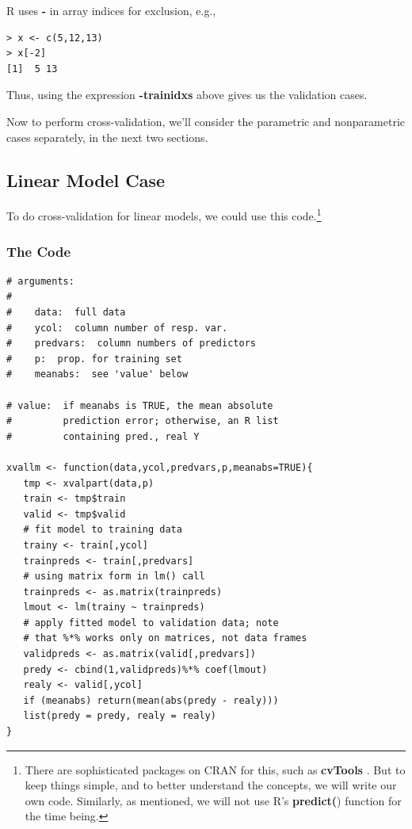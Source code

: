 R uses {\bf -} in array indices for exclusion, e.g.,

\begin{lstlisting}
> x <- c(5,12,13)
> x[-2]
[1]  5 13
\end{lstlisting}

Thus, using the expression {\bf -trainidxs} above gives us the validation
cases.

Now to perform cross-validation, we'll consider the parametric and
nonparametric cases separately, in the next two sections.

\subsection{Linear Model Case}
\label{xvallinmod}

To do cross-validation for linear models, we could use this
code.\footnote{There are sophisticated packages on CRAN for this, such
as {\bf cvTools} \cite{cvTools}.  But to keep things simple, and to
better understand the concepts, we will write our own code.  Similarly,
as mentioned, we will not use R's {\bf predict(}) function for the time
being.}

\subsubsection{The Code}
\label{xvalcode}

\begin{lstlisting}
# arguments:
#
#    data:  full data
#    ycol:  column number of resp. var.
#    predvars:  column numbers of predictors
#    p:  prop. for training set
#    meanabs:  see 'value' below
    
# value:  if meanabs is TRUE, the mean absolute 
#         prediction error; otherwise, an R list
#         containing pred., real Y

xvallm <- function(data,ycol,predvars,p,meanabs=TRUE){
   tmp <- xvalpart(data,p)
   train <- tmp$train
   valid <- tmp$valid
   # fit model to training data
   trainy <- train[,ycol]
   trainpreds <- train[,predvars]
   # using matrix form in lm() call
   trainpreds <- as.matrix(trainpreds)
   lmout <- lm(trainy ~ trainpreds)
   # apply fitted model to validation data; note
   # that %*% works only on matrices, not data frames
   validpreds <- as.matrix(valid[,predvars])
   predy <- cbind(1,validpreds)%*% coef(lmout)
   realy <- valid[,ycol]
   if (meanabs) return(mean(abs(predy - realy)))
   list(predy = predy, realy = realy)
}
\end{lstlisting}

